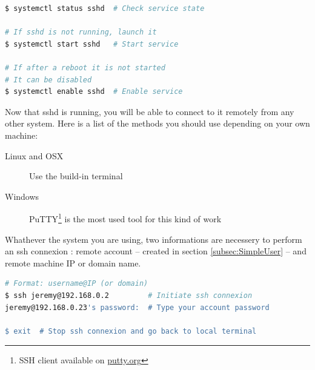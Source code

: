 \begin{lstlisting}[language=bash,caption=Check service state]
$ systemctl status sshd  # Check service state

# If sshd is not running, launch it
$ systemctl start sshd   # Start service

# If after a reboot it is not started
# It can be disabled
$ systemctl enable sshd  # Enable service
\end{lstlisting}

Now that sshd is running, you will be able to connect to it remotely from any 
other system. Here is a list of the methods you should use depending on your own 
machine:

\begin{description}
	\item[Linux and OSX] Use the build-in terminal 
	\item[Windows] PuTTY\footnote{SSH client available on 
					\href{http://www.putty.org}{putty.org}} is the most used 
					tool for this kind of work
\end{description}

Whathever the system you are using, two informations are necessery to perform 
an ssh connexion : remote account --  created in section \ref{subsec:SimpleUser} 
-- and remote machine IP or domain name.

\begin{lstlisting}[language=bash,caption=SSH with command line]
# Format: username@IP (or domain)
$ ssh jeremy@192.168.0.2         # Initiate ssh connexion
jeremy@192.168.0.23's password:  # Type your account password

$ exit  # Stop ssh connexion and go back to local terminal
\end{lstlisting}
